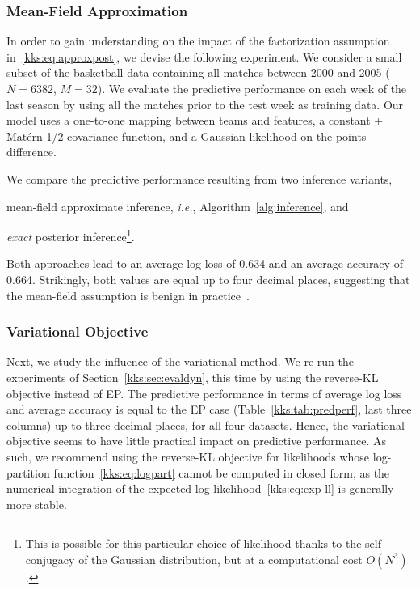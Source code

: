 \subsubsection{Mean-Field Approximation}
In order to gain understanding on the impact of the factorization assumption in~\eqref{kks:eq:approxpost}, we devise the following experiment.
We consider a small subset of the basketball data containing all matches between 2000 and 2005 ($N = 6382$, $M = 32$).
We evaluate the predictive performance on each week of the last season by using all the matches prior to the test week as training data.
Our model uses a one-to-one mapping between teams and features, a constant + Matérn 1/2 covariance function, and a Gaussian likelihood on the points difference.

We compare the predictive performance resulting from two inference variants,
\begin{enuminline}
	\item mean-field approximate inference, \textit{i.e.}, Algorithm~\ref{alg:inference}, and
	\item \emph{exact} posterior inference\footnote{%
		This is possible for this particular choice of likelihood thanks to the self-conjugacy of the Gaussian distribution, but at a computational cost $O(N^3)$.}.
\end{enuminline}
Both approaches lead to an average log loss of \num{0.634} and an average accuracy of \num{0.664}.
Strikingly, both values are equal up to four decimal places, suggesting that the mean-field assumption is benign in practice~\citep{birlutiu2007expectation}.


\subsubsection{Variational Objective}
Next, we study the influence of the variational method.
We re-run the experiments of Section~\ref{kks:sec:evaldyn}, this time by using the reverse-KL objective instead of EP.
The predictive performance in terms of average log loss and average accuracy is equal to the EP case (Table~\ref{kks:tab:predperf}, last three columns) up to three decimal places, for all four datasets.
Hence, the variational objective seems to have little practical impact on predictive performance.
As such, we recommend using the reverse-KL objective for likelihoods whose log-partition function~\eqref{kks:eq:logpart} cannot be computed in closed form, as the numerical integration of the expected log-likelihood~\eqref{kks:eq:exp-ll} is generally more stable.


